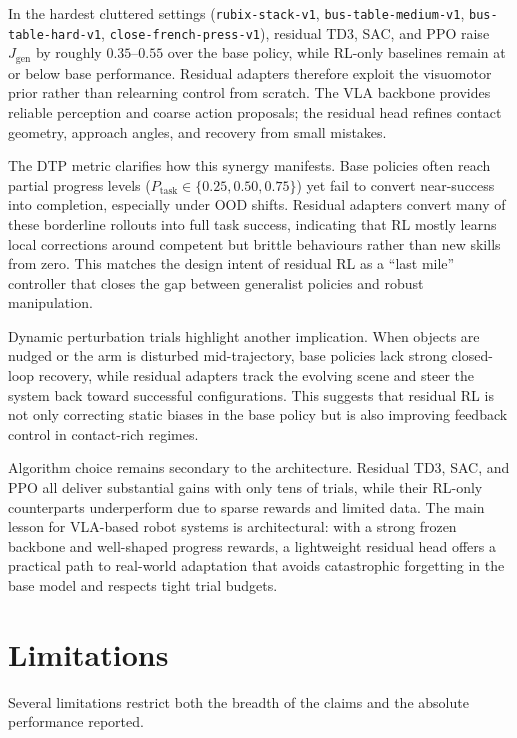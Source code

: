 In the hardest cluttered settings (\texttt{rubix-stack-v1}, \texttt{bus-table-\allowbreak medium-v1}, \texttt{bus-table-\allowbreak hard-v1}, \texttt{close-french-\allowbreak press-v1}), residual TD3, SAC, and PPO raise $J_{\text{gen}}$ by roughly $0.35$–$0.55$ over the base policy, while RL-only baselines remain at or below base performance. Residual adapters therefore exploit the visuomotor prior rather than relearning control from scratch. The VLA backbone provides reliable perception and coarse action proposals; the residual head refines contact geometry, approach angles, and recovery from small mistakes.

The DTP metric clarifies how this synergy manifests. Base policies often reach partial progress levels ($P_{\text{task}} \in \{0.25, 0.50, 0.75\}$) yet fail to convert near-success into completion, especially under OOD shifts. Residual adapters convert many of these borderline rollouts into full task success, indicating that RL mostly learns local corrections around competent but brittle behaviours rather than new skills from zero. This matches the design intent of residual RL as a “last mile” controller that closes the gap between generalist policies and robust manipulation.

Dynamic perturbation trials highlight another implication. When objects are nudged or the arm is disturbed mid-trajectory, base policies lack strong closed-loop recovery, while residual adapters track the evolving scene and steer the system back toward successful configurations. This suggests that residual RL is not only correcting static biases in the base policy but is also improving feedback control in contact-rich regimes.

Algorithm choice remains secondary to the architecture. Residual TD3, SAC, and PPO all deliver substantial gains with only tens of trials, while their RL-only counterparts underperform due to sparse rewards and limited data. The main lesson for VLA-based robot systems is architectural: with a strong frozen backbone and well-shaped progress rewards, a lightweight residual head offers a practical path to real-world adaptation that avoids catastrophic forgetting in the base model and respects tight trial budgets.


\section{Limitations}

Several limitations restrict both the breadth of the claims and the absolute performance reported.

